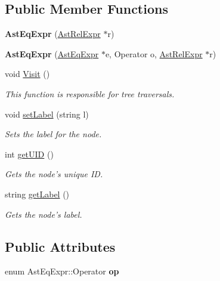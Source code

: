 \subsection*{Public Member Functions}
\begin{DoxyCompactItemize}
\item 
\hypertarget{classAstEqExpr_ae59f45e93845f531132980db8e8b8e2b}{{\bfseries Ast\-Eq\-Expr} (\hyperlink{classAstRelExpr}{Ast\-Rel\-Expr} $\ast$r)}\label{classAstEqExpr_ae59f45e93845f531132980db8e8b8e2b}

\item 
\hypertarget{classAstEqExpr_aac47a62e5410c55ac1f645a699e05ec4}{{\bfseries Ast\-Eq\-Expr} (\hyperlink{classAstEqExpr}{Ast\-Eq\-Expr} $\ast$e, Operator o, \hyperlink{classAstRelExpr}{Ast\-Rel\-Expr} $\ast$r)}\label{classAstEqExpr_aac47a62e5410c55ac1f645a699e05ec4}

\item 
void \hyperlink{classAstEqExpr_a6e0e9e88f6801eb135efef5bb5fe2851}{Visit} ()
\begin{DoxyCompactList}\small\item\em This function is responsible for tree traversals. \end{DoxyCompactList}\item 
void \hyperlink{classAST_a71d680856e95ff89f55d5311a552eba6}{set\-Label} (string l)
\begin{DoxyCompactList}\small\item\em Sets the label for the node. \end{DoxyCompactList}\item 
int \hyperlink{classAST_ab7a5b1d9f1c2de0d98deb356f724a42c}{get\-U\-I\-D} ()
\begin{DoxyCompactList}\small\item\em Gets the node's unique I\-D. \end{DoxyCompactList}\item 
string \hyperlink{classAST_aee029be902fffc927d16ccb03eb922ad}{get\-Label} ()
\begin{DoxyCompactList}\small\item\em Gets the node's label. \end{DoxyCompactList}\end{DoxyCompactItemize}
\subsection*{Public Attributes}
\begin{DoxyCompactItemize}
\item 
\hypertarget{classAstEqExpr_a33d1f50f34d77c20226b92f92112aa56}{enum Ast\-Eq\-Expr\-::\-Operator {\bfseries op}}\label{classAstEqExpr_a33d1f50f34d77c20226b92f92112aa56}

\end{DoxyCompactItemize}
